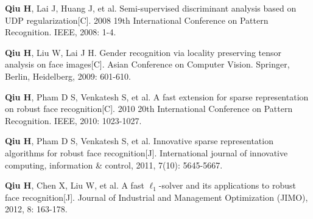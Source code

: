 \begin{publications}{99}
\setlength{\itemsep}{0em}

\item \textbf{Qiu H}, Lai J, Huang J, et al. Semi-supervised discriminant analysis based on UDP regularization[C]. 2008 19th International Conference on Pattern Recognition. IEEE, 2008: 1-4.

\item \textbf{Qiu H}, Liu W, Lai J H. Gender recognition via locality preserving tensor analysis on face images[C]. Asian Conference on Computer Vision. Springer, Berlin, Heidelberg, 2009: 601-610.

\item \textbf{Qiu H}, Pham D S, Venkatesh S, et al. A fast extension for sparse representation on robust face recognition[C]. 2010 20th International Conference on Pattern Recognition. IEEE, 2010: 1023-1027.

\item \textbf{Qiu H}, Pham D S, Venkatesh S, et al. Innovative sparse representation algorithms for robust face recognition[J]. International journal of innovative computing, information \& control, 2011, 7(10): 5645-5667.

\item \textbf{Qiu H}, Chen X, Liu W, et al. A fast $\ell_1$-solver and its applications to robust face recognition[J]. Journal of Industrial and Management Optimization (JIMO), 2012, 8: 163-178.

\end{publications}